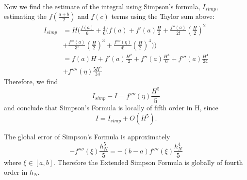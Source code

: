 \documentclass[11pt]{article}
\begin{document}
Now we find the estimate of the integral using Simpson's formula, $I_{simp}$, estimating the $f(\frac{a+b}{2})$ and $f(c)$ terms using the Taylor sum above:
\begin{align*}
I_{simp} &= H\bigg(\frac{f(a)}{6} + \frac{4}{6}\big(f(a) + f'(a)\frac{H}{2} + \frac{f''(a)}{2!} (\frac{H}{2})^2 \\
&+ \frac{f'''(a)}{3!} (\frac{H}{2})^3 + \frac{f''''(\eta)}{4!} (\frac{H}{2})^4 \big) \bigg) \\
&= f(a)H + f'(a)\frac{H^2}{2} + f''(a)\frac{H^3}{6} + f'''(a)\frac{H^4}{24} \\
&+ f''''(\eta)\frac{5H^5}{24}
\end{align*}
Therefore, we find
\[
I_{simp} - I = f''''(\eta)\frac{H^5}{5}
\]
and conclude that Simpson's Formula is locally of fifth order in H, since
\[
I = I_{simp} + O(H^5).
\]

The global error of Simpson's Formula is approximately
\[
-f''''(\xi)\frac{h_N^5}{5} = -(b-a)f''''(\xi)\frac{h_N^4}{5}
\]
where $\xi \in [a,b]$. Therefore the Extended Simpson Formula is globally of fourth order in $h_N$.
\end{document}
